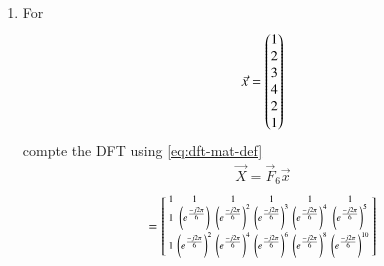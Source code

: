 \documentclass[journal,12pt,twocolumn]{IEEEtran}
\renewcommand\thesection{\arabic{section}}
\begin{document}
\begin{enumerate}[label=\thesection.\arabic*
	,ref=\thesection.\theenumi]
\begin{enumerate}[label=\arabic*.,ref=\thesection.\theenumi]
\begin{align}
	\begin{bmatrix}
		x(1) \\ 
		x(5) \\ 
	\end{bmatrix} \\
	\begin{bmatrix}
		X_{6}(0) \\ 
		X_{6}(1)\\ 
	\end{bmatrix}
	= F_{2}
	\begin{bmatrix}
		x(3) \\ 
		x(7) \\ 
	\end{bmatrix}
\end{align}
But observe that from 7.25,
\begin{align}
	\vec{P}_8\vec{x} &= \myvec{\vec{x}_1\\\vec{x}_2} \\
	\vec{P}_4\vec{x}_1 &= \myvec{\vec{x}_3\\\vec{x}_4} \\ 
	\vec{P}_4\vec{x}_2 &= \myvec{\vec{x}_5\\\vec{x}_6}
\end{align}
where we define $x_3(k) = x(4k)$, $x_4(k) = x(4k + 2)$, $x_5(k) = x(4k + 1)$, and $x_6(k) = x(4k + 3)$ for $k = 0, 1$.
	\item For 
	\begin{align}
		\vec{x} = \begin{pmatrix}1\\2\\3\\4\\2\\1\end{pmatrix}
		\label{eq:equation1}
	\end{align}
	compte the DFT  
	using 
	\eqref{eq:dft-mat-def} \\
	\solution
	\begin{align}
		\vec{X} = \vec{F}_6 \vec{x}
	\end{align}	
	\begin{align}
		= \begin{bsmallmatrix}
			1	&	1	&	1	&	1	&	1	&	1\\
			1	&	\brak{e^{\frac{-j2\pi}{6}}}	&	\brak{e^{\frac{-j2\pi}{6}}}^2	&	\brak{e^{\frac{-j2\pi}{6}}}^3	&	\brak{e^{\frac{-j2\pi}{6}}}^4	&	\brak{e^{\frac{-j2\pi}{6}}}^5\\
			1	&	\brak{e^{\frac{-j2\pi}{6}}}^2	&	\brak{e^{\frac{-j2\pi}{6}}}^4	&	\brak{e^{\frac{-j2\pi}{6}}}^6	&	\brak{e^{\frac{-j2\pi}{6}}}^8	&	\brak{e^{\frac{-j2\pi}{6}}}^{10}\\

\end{bsmallmatrix}
\end{align}
\end{enumerate}
\end{enumerate}
\end{document}
